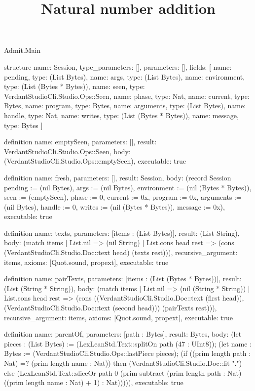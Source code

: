 \begin{lexlean}{Admit.Main}
\title{Natural number addition}
\begin{semanticmodule}
structure{
  name: Session,
  type_parameters: [],
  parameters: [],
  fields: [
    {name: pending, type: (List Bytes)},
    {name: args, type: (List Bytes)},
    {name: environment, type: (List (Bytes * Bytes))},
    {name: seen, type: VerdantStudioCli.Studio.Ops::Seen},
    {name: phase, type: Nat},
    {name: current, type: Bytes},
    {name: program, type: Bytes},
    {name: arguments, type: (List Bytes)},
    {name: handle, type: Nat},
    {name: writes, type: (List (Bytes * Bytes))},
    {name: message, type: Bytes}
  ]
}

definition{
  name: emptySeen,
  parameters: [],
  result: VerdantStudioCli.Studio.Ops::Seen,
  body: (VerdantStudioCli.Studio.Ops::emptySeen),
  executable: true
}

definition{
  name: fresh,
  parameters: [],
  result: Session,
  body: (record Session {pending := (nil Bytes), args := (nil Bytes), environment := (nil (Bytes * Bytes)), seen := (emptySeen), phase := 0, current := 0x, program := 0x, arguments := (nil Bytes), handle := 0, writes := (nil (Bytes * Bytes)), message := 0x}),
  executable: true
}

definition{
  name: texts,
  parameters: [items : (List Bytes)],
  result: (List String),
  body: (match items
    | List.nil => (nil String)
    | List.cons head rest => (cons (VerdantStudioCli.Studio.Doc::text head) (texts rest))),
  recursive_argument: items,
  axioms: [Quot.sound, propext],
  executable: true
}

definition{
  name: pairTexts,
  parameters: [items : (List (Bytes * Bytes))],
  result: (List (String * String)),
  body: (match items
    | List.nil => (nil (String * String))
    | List.cons head rest => (cons ((VerdantStudioCli.Studio.Doc::text (first head)), (VerdantStudioCli.Studio.Doc::text (second head))) (pairTexts rest))),
  recursive_argument: items,
  axioms: [Quot.sound, propext],
  executable: true
}

definition{
  name: parentOf,
  parameters: [path : Bytes],
  result: Bytes,
  body: (let pieces : (List Bytes) := (LexLeanStd.Text::splitOn path (47 : UInt8)); (let name : Bytes := (VerdantStudioCli.Studio.Ops::lastPiece pieces); (if ((prim length path : Nat) =? (prim length name : Nat)) then (VerdantStudioCli.Studio.Doc::lit ".") else (LexLeanStd.Text::sliceOr path 0 (prim subtract (prim length path : Nat) ((prim length name : Nat) + 1) : Nat))))),
  executable: true
}


\end{semanticmodule}
\end{lexlean}
